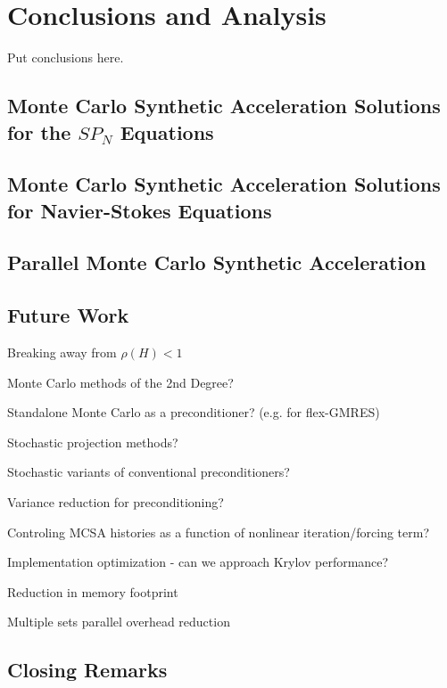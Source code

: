 \chapter{Conclusions and Analysis\ }
\label{ch:conclusion}
Put conclusions here.

\section{Monte Carlo Synthetic Acceleration Solutions for the $SP_N$ Equations\ }
\label{sec:spn_conclusion}

\section{Monte Carlo Synthetic Acceleration Solutions for Navier-Stokes Equations\ }
\label{sec:nonlinear_conclusions}

\section{Parallel Monte Carlo Synthetic Acceleration\ }
\label{sec:parallel_mc_conclusions}

\section{Future Work\ }
\label{sec:future_work}

Breaking away from $\rho(H) < 1$

Monte Carlo methods of the 2nd Degree?

Standalone Monte Carlo as a preconditioner? (e.g. for flex-GMRES)

Stochastic projection methods?

Stochastic variants of conventional preconditioners?

Variance reduction for preconditioning?

Controling MCSA histories as a function of nonlinear iteration/forcing
term?

Implementation optimization - can we approach Krylov performance?

Reduction in memory footprint

Multiple sets parallel overhead reduction

\section{Closing Remarks\ }
\label{sec:closing}
